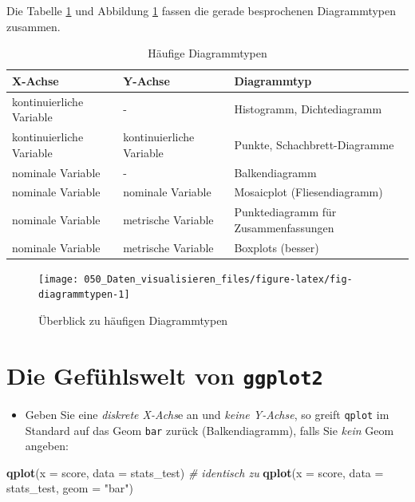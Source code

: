 \documentclass[12pt,ngerman,]{book}
\makeatletter
\newenvironment{Shaded}{\begin{snugshade}}{\end{snugshade}}
\newcommand{\KeywordTok}[1]{\textcolor[rgb]{0.13,0.29,0.53}{\textbf{#1}}}
\newcommand{\DataTypeTok}[1]{\textcolor[rgb]{0.13,0.29,0.53}{#1}}
\newcommand{\StringTok}[1]{\textcolor[rgb]{0.31,0.60,0.02}{#1}}
\newcommand{\CommentTok}[1]{\textcolor[rgb]{0.56,0.35,0.01}{\textit{#1}}}
\newcommand{\NormalTok}[1]{#1}
\providecommand{\tightlist}{%
  \setlength{\itemsep}{0pt}\setlength{\parskip}{0pt}}
\newenvironment{kframe}{%
\medskip{}
\setlength{\fboxsep}{.8em}
 \def\at@end@of@kframe{}%
 \ifinner\ifhmode%
  \def\at@end@of@kframe{\end{minipage}}%
  \begin{minipage}{\columnwidth}%
 \fi\fi%
 \def\FrameCommand##1{\hskip\@totalleftmargin \hskip-\fboxsep
 \colorbox{shadecolor}{##1}\hskip-\fboxsep
     \hskip-\linewidth \hskip-\@totalleftmargin \hskip\columnwidth}%
 \MakeFramed {\advance\hsize-\width
   \@totalleftmargin\z@ \linewidth\hsize
   \@setminipage}}%
 {\par\unskip\endMakeFramed%
 \at@end@of@kframe}
\renewenvironment{Shaded}{\begin{kframe}}{\end{kframe}}
\theoremstyle{definition}
\theoremstyle{definition}
\theoremstyle{remark}
\makeatother
\begin{document}
Die Tabelle \ref{tab:diagrammtypen} und Abbildung
\ref{fig:fig-diagrammtypen} fassen die gerade besprochenen Diagrammtypen
zusammen.

\begin{table}

\caption{\label{tab:diagrammtypen}Häufige Diagrammtypen}
\centering
\begin{tabular}[t]{l|l|l}
\hline
X-Achse & Y-Achse & Diagrammtyp\\
\hline
kontinuierliche Variable & - & Histogramm, Dichtediagramm\\
\hline
kontinuierliche Variable & kontinuierliche Variable & Punkte, Schachbrett-Diagramme\\
\hline
nominale Variable & - & Balkendiagramm\\
\hline
nominale Variable & nominale Variable & Mosaicplot (Fliesendiagramm)\\
\hline
nominale Variable & metrische Variable & Punktediagramm für Zusammenfassungen\\
\hline
nominale Variable & metrische Variable & Boxplots (besser)\\
\hline
\end{tabular}
\end{table}

\begin{figure}

{\centering \texttt{[image: 050\_Daten\_visualisieren\_files/figure-latex/fig-diagrammtypen-1]} 

}

\caption{Überblick zu häufigen Diagrammtypen}\label{fig:fig-diagrammtypen}
\end{figure}

\section{\texorpdfstring{Die Gefühlswelt von
\texttt{ggplot2}}{Die Gefühlswelt von ggplot2}}\label{die-gefuhlswelt-von-ggplot2}

\begin{itemize}
\tightlist
\item
  Geben Sie eine \emph{diskrete X-Achs}e an und \emph{keine Y-Achse}, so
  greift \texttt{qplot} im Standard auf das Geom \texttt{bar} zurück
  (Balkendiagramm), falls Sie \emph{kein} Geom angeben:
\end{itemize}

\begin{Shaded}
\begin{Highlighting}[]
\KeywordTok{qplot}\NormalTok{(}\DataTypeTok{x =}\NormalTok{ score, }\DataTypeTok{data =}\NormalTok{ stats_test)  }\CommentTok{# identisch zu}
\KeywordTok{qplot}\NormalTok{(}\DataTypeTok{x =}\NormalTok{ score, }\DataTypeTok{data =}\NormalTok{ stats_test, }\DataTypeTok{geom =} \StringTok{"bar"}\NormalTok{)}
\end{Highlighting}
\end{Shaded}
\end{document}
